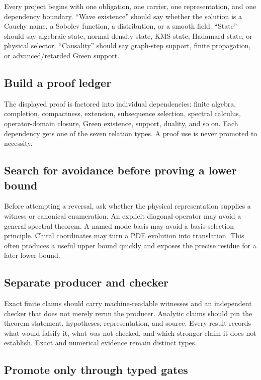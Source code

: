 \documentclass[11pt]{article}
\theoremstyle{definition}
\theoremstyle{remark}
\begin{document}
Every project begins with one obligation, one carrier, one representation,
and one dependency boundary.  ``Wave existence'' should say whether the
solution is a Cauchy name, a Sobolev function, a distribution, or a smooth
field.  ``State'' should say algebraic state, normal density state, KMS state,
Hadamard state, or physical selector.  ``Causality'' should say graph-step
support, finite propagation, or advanced/retarded Green support.

\subsection{Build a proof ledger}

The displayed proof is factored into individual dependencies: finite algebra,
completion, compactness, extension, subsequence selection, spectral calculus,
operator-domain closure, Green existence, support, duality, and so on.  Each
dependency gets one of the seven relation types.  A proof use is never
promoted to necessity.

\subsection{Search for avoidance before proving a lower bound}

Before attempting a reversal, ask whether the physical representation supplies
a witness or canonical enumeration.  An explicit diagonal operator may avoid
a general spectral theorem.  A named mode basis may avoid a basis-selection
principle.  Chiral coordinates may turn a PDE evolution into translation.
This often produces a useful upper bound quickly and exposes the precise
residue for a later lower bound.

\subsection{Separate producer and checker}

Exact finite claims should carry machine-readable witnesses and an independent
checker that does not merely rerun the producer.  Analytic claims should pin
the theorem statement, hypotheses, representation, and source.  Every result
records what would falsify it, what was not checked, and which stronger claim
it does not establish.  Exact and numerical evidence remain distinct types.

\subsection{Promote only through typed gates}
\end{document}

